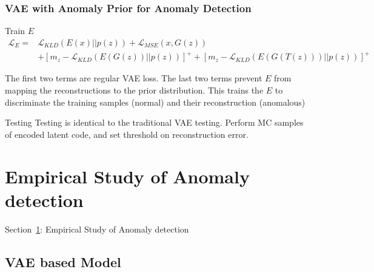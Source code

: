 \documentclass{beamer}
\begin{document}
\begin{frame}
\frametitle{VAE with Anomaly Prior for Anomaly Detection}

\begin{block}{Train $E$}
\[
\begin{split}
\mathcal{L}_E =& \mathcal{L}_{KLD}(E(x)||p(z)) + \mathcal{L}_{MSE}(x, G(z)) \\
& + [m_z-\mathcal{L}_{KLD}(E(G(z))||p(z))]^+ + [m_z-\mathcal{L}_{KLD}(E(G(T(z)))||p(z))]^+
\end{split}
\]

The first two terms are regular VAE loss. The last two terms prevent $E$ from mapping the reconstructions to the prior distribution. 
This trains the $E$ to discriminate the training samples (normal) and their reconstruction (anomalous)
\end{block}

\begin{block}{Testing}
Testing is identical to the traditional VAE testing. Perform MC samples of encoded latent code, and set threshold on reconstruction error.
\end{block}

\end{frame}


\section{Empirical Study of Anomaly detection}
\label{sec-anomaly}
\begin{frame}
\centerline{Section~\ref{sec-anomaly}: Empirical Study of Anomaly detection}
\end{frame}

\subsection{VAE based Model}
\end{document}
